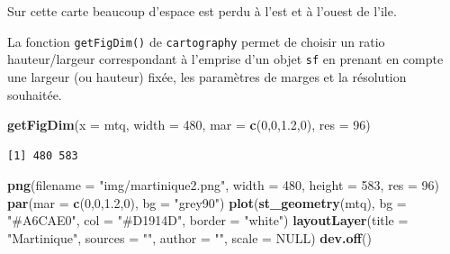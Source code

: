 \documentclass[]{book}
\newenvironment{Shaded}{\begin{snugshade}}{\end{snugshade}}
\newcommand{\KeywordTok}[1]{\textcolor[rgb]{0.13,0.29,0.53}{\textbf{#1}}}
\newcommand{\DataTypeTok}[1]{\textcolor[rgb]{0.13,0.29,0.53}{#1}}
\newcommand{\DecValTok}[1]{\textcolor[rgb]{0.00,0.00,0.81}{#1}}
\newcommand{\FloatTok}[1]{\textcolor[rgb]{0.00,0.00,0.81}{#1}}
\newcommand{\StringTok}[1]{\textcolor[rgb]{0.31,0.60,0.02}{#1}}
\newcommand{\OtherTok}[1]{\textcolor[rgb]{0.56,0.35,0.01}{#1}}
\newcommand{\NormalTok}[1]{#1}
\begin{document}
Sur cette carte beaucoup d'espace est perdu à l'est et à l'ouest de
l'ile.

La fonction \texttt{getFigDim()} de \texttt{cartography} permet de
choisir un ratio hauteur/largeur correspondant à l'emprise d'un objet
\texttt{sf} en prenant en compte une largeur (ou hauteur) fixée, les
paramètres de marges et la résolution souhaitée.

\begin{Shaded}
\begin{Highlighting}[]
\KeywordTok{getFigDim}\NormalTok{(}\DataTypeTok{x =}\NormalTok{ mtq, }\DataTypeTok{width =} \DecValTok{480}\NormalTok{, }\DataTypeTok{mar =} \KeywordTok{c}\NormalTok{(}\DecValTok{0}\NormalTok{,}\DecValTok{0}\NormalTok{,}\FloatTok{1.2}\NormalTok{,}\DecValTok{0}\NormalTok{), }\DataTypeTok{res =} \DecValTok{96}\NormalTok{)}
\end{Highlighting}
\end{Shaded}

\begin{verbatim}
[1] 480 583
\end{verbatim}

\begin{Shaded}
\begin{Highlighting}[]
\KeywordTok{png}\NormalTok{(}\DataTypeTok{filename =} \StringTok{"img/martinique2.png"}\NormalTok{, }\DataTypeTok{width =} \DecValTok{480}\NormalTok{, }\DataTypeTok{height =} \DecValTok{583}\NormalTok{, }\DataTypeTok{res =} \DecValTok{96}\NormalTok{)}
\KeywordTok{par}\NormalTok{(}\DataTypeTok{mar =} \KeywordTok{c}\NormalTok{(}\DecValTok{0}\NormalTok{,}\DecValTok{0}\NormalTok{,}\FloatTok{1.2}\NormalTok{,}\DecValTok{0}\NormalTok{), }\DataTypeTok{bg =} \StringTok{"grey90"}\NormalTok{)}
\KeywordTok{plot}\NormalTok{(}\KeywordTok{st_geometry}\NormalTok{(mtq), }\DataTypeTok{bg =} \StringTok{"#A6CAE0"}\NormalTok{, }\DataTypeTok{col =} \StringTok{"#D1914D"}\NormalTok{, }\DataTypeTok{border =} \StringTok{"white"}\NormalTok{)}
\KeywordTok{layoutLayer}\NormalTok{(}\DataTypeTok{title =} \StringTok{"Martinique"}\NormalTok{, }\DataTypeTok{sources =} \StringTok{""}\NormalTok{, }\DataTypeTok{author =} \StringTok{""}\NormalTok{, }\DataTypeTok{scale =} \OtherTok{NULL}\NormalTok{)}
\KeywordTok{dev.off}\NormalTok{()}
\end{Highlighting}
\end{Shaded}
\end{document}
